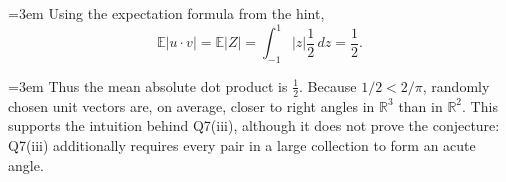 \documentclass[11pt]{article}
\newcommand{\solutioncontinuation}{\par\leftskip=3em\noindent\ignorespaces}
\begin{document}
\solutioncontinuation{} Using the expectation formula from the hint,
\[
\mathbb E|u\cdot v|
=\mathbb E|Z|
=\int_{-1}^{1}|z|\frac12\,dz
=\frac12.
\]
\solutioncontinuation{} Thus the mean absolute dot product is $\boxed{\tfrac12}$.
Because $1/2<2/\pi$, randomly chosen unit vectors are, on average, closer to right angles in $\mathbb R^3$ than in $\mathbb R^2$. This supports the intuition behind Q7(iii), although it does not prove the conjecture: Q7(iii) additionally requires every pair in a large collection to form an acute angle.
\end{document}
